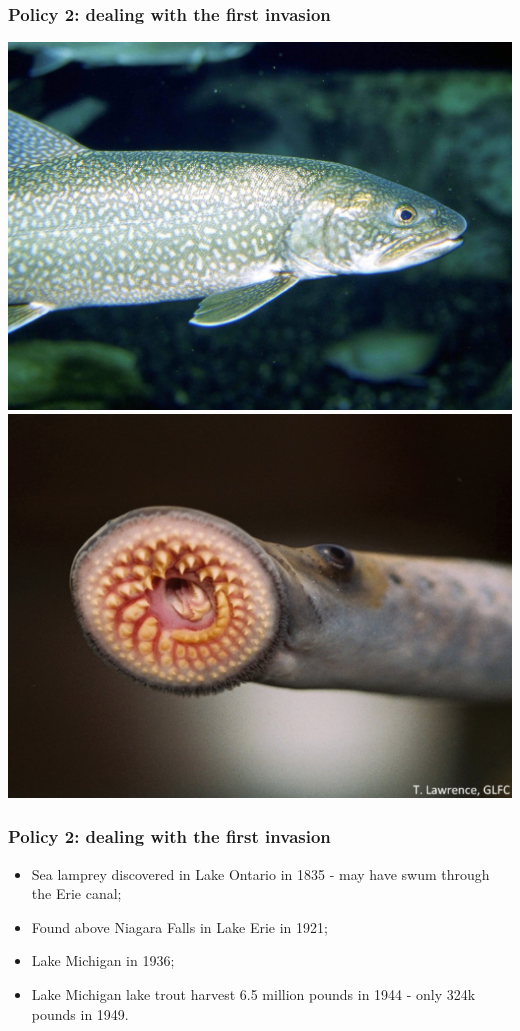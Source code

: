 \documentclass[aspectratio=169]{beamer}
\theoremstyle{principle}
\begin{document}
\begin{frame}
\frametitle{Policy 2: dealing with the first invasion}

    \begin{center}
     \includegraphics[scale=0.087]{lake_trout.jpg}
          \includegraphics[scale=0.5]{sea_lamprey.png}
     \end{center}

\end{frame}

\begin{frame}
\frametitle{Policy 2: dealing with the first invasion}

\begin{itemize}
\item Sea lamprey discovered in Lake Ontario in 1835 - may have swum through the Erie canal;
\bigskip
\bigskip
\item Found above Niagara Falls in Lake Erie in 1921;
\bigskip
\bigskip
\item Lake Michigan in 1936;
\bigskip
\bigskip
\item Lake Michigan lake trout harvest 6.5 million pounds in 1944 - only 324k pounds in 1949.
\end{itemize}

\end{frame}
\end{document}
